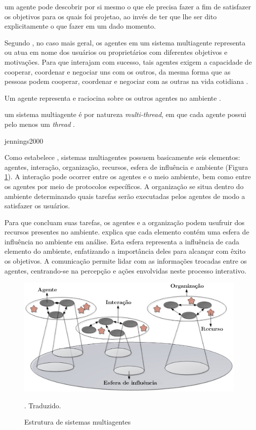 um agente pode descobrir por si mesmo o que ele precisa fazer a fim de satisfazer os objetivos para os quais foi projetao, ao invés de ter que lhe ser dito explicitamente o que fazer em um dado momento.

 Segundo , no caso mais geral, os agentes em um sistema multiagente representa ou atua em nome dos usuários ou proprietários com diferentes objetivos e motivações. Para que interajam com sucesso, tais agentes exigem a capacidade de cooperar, coordenar e negociar uns com os outros, da mesma forma que as pessoas podem cooperar, coordenar e negociar com as outras na vida cotidiana \cite[pág. 3]{livrao}.

Um agente representa e raciocina sobre os outros agentes no ambiente \cite[pág. 887]{van2008handbook}. 

um sistema multiagente é por natureza \textit{multi-thread}, em que cada agente possui pelo menos um \textit{thread} \cite[pág. 27]{livrao}.


jennings2000

Como estabelece , sistemas multiagentes possuem basicamente seis elementos: agentes, interação, organização, recursos, esfera de influência e ambiente (Figura \ref{fig:sma_estrutura}). A interação pode ocorrer entre os agentes e o meio ambiente, bem como entre os agentes por meio de protocolos específicos. A organização se situa dentro do ambiente determinando quais tarefas serão executadas pelos agentes de modo a satisfazer os usuários. 

Para que concluam suas tarefas, os agentes e a organização podem usufruir dos recursos presentes no ambiente.  explica que cada elemento contém uma esfera de influência no ambiente em análise. Esta esfera representa a influência de cada elemento do ambiente, enfatizando a importância deles para alcançar com êxito os objetivos. A comunicação permite lidar com as informações trocadas entre os agentes, centrando-se na percepção e ações envolvidas neste processo interativo.

\begin{figure}[h!]
    \includegraphics[scale=0.3]{figuras/sma_estrutura}
    \centering
    \caption{Estrutura de sistemas multiagentes  }. Traduzido.
    \label{fig:sma_estrutura}
\end{figure}


